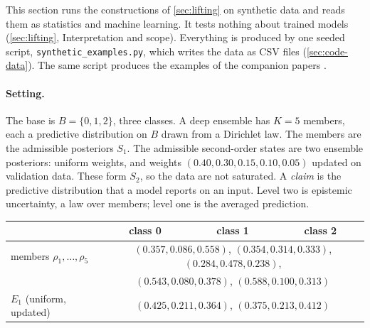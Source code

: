 \documentclass[11pt]{article}
\theoremstyle{definition}
\theoremstyle{remark}
\begin{document}
This section runs the constructions of \cref{sec:lifting} on synthetic data and reads them as statistics and machine
learning. It tests nothing about trained models (\cref{sec:lifting}, Interpretation and scope). Everything is produced by
one seeded script, \texttt{synthetic\_examples.py}, which writes the data as CSV files (\cref{sec:code-data}). The same
script produces the examples of the companion papers \cite{Conditionals,Awasthi-Family}.

\paragraph{Setting.} The base is $B=\{0,1,2\}$, three classes. A deep ensemble has $K=5$ members, each a predictive
distribution on $B$ drawn from a Dirichlet law. The members are the admissible posteriors $S_1$. The admissible
second-order states are two ensemble posteriors: uniform weights, and weights $(0.40,0.30,0.15,0.10,0.05)$ updated
on validation data. These form $S_2$, so the data are not saturated. A \emph{claim} is the predictive distribution
that a model reports on an input. Level two is epistemic uncertainty, a law over members; level one is the averaged
prediction.
\begin{center}\small
\begin{tabular}{@{}lccc@{}}
\toprule
& class 0 & class 1 & class 2\\
\midrule
members $\rho_1,\dots,\rho_5$ & \multicolumn{3}{c}{$(0.357,0.086,0.558)$, $(0.354,0.314,0.333)$, $(0.284,0.478,0.238)$,}\\
& \multicolumn{3}{c}{$(0.543,0.080,0.378)$, $(0.588,0.100,0.313)$}\\
$E_1$ (uniform, updated) & \multicolumn{3}{c}{$(0.425,0.211,0.364)$, \quad $(0.375,0.213,0.412)$}\\
\bottomrule
\end{tabular}
\end{center}
\end{document}
